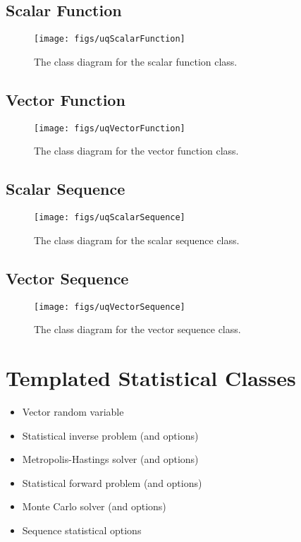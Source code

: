 \clearpage
\subsection{Scalar Function}

\begin{figure}[h!]
\centerline{
\texttt{[image: figs/uqScalarFunction]}
}
\caption{
The class diagram for the scalar function class.
}
\label{fig-scalar-function-class}
\end{figure}

\clearpage
\subsection{Vector Function}

\begin{figure}[h!]
\centerline{
\texttt{[image: figs/uqVectorFunction]}
}
\caption{
The class diagram for the vector function class.
}
\label{fig-vector-function-class}
\end{figure}

\clearpage
\subsection{Scalar Sequence}

\begin{figure}[h!]
\centerline{
\texttt{[image: figs/uqScalarSequence]}
}
\caption{
The class diagram for the scalar sequence class.
}
\label{fig-scalar-sequence-class}
\end{figure}

\clearpage
\subsection{Vector Sequence}

\begin{figure}[h!]
\centerline{
\texttt{[image: figs/uqVectorSequence]}
}
\caption{
The class diagram for the vector sequence class.
}
\label{fig-vector-sequence-class}
\end{figure}

\clearpage
\section{Templated Statistical Classes}

\begin{itemize}
\item Vector random variable
\item Statistical inverse problem (and options)
\item Metropolis-Hastings solver (and options)
\item Statistical forward problem (and options)
\item Monte Carlo solver (and options)
\item Sequence statistical options
\end{itemize}


